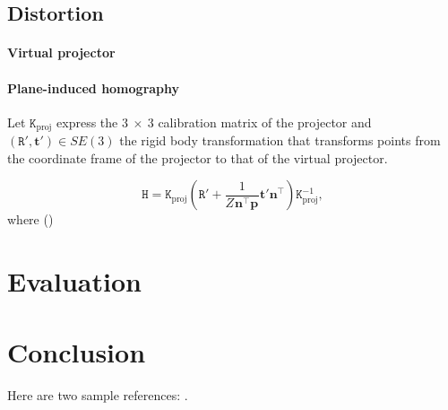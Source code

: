 \documentclass[review]{elsarticle}
\begin{document}
\subsection{Distortion}

\paragraph{Virtual projector}

\paragraph{Plane-induced homography} Let $\mathtt{K}_\text{proj}$ express the $3~\times~3$ calibration matrix of the projector and $(\mathtt{R}', \mathbf{t}') \in SE(3)$ the rigid body transformation that transforms points from the coordinate frame of the projector to that of the virtual projector.

\begin{equation}
\mathtt{H} = \mathtt{K}_\text{proj}\left(\mathtt{R}' + \frac{1}{Z^{} \mathbf{n}^\top \mathbf{p}^{}}\mathbf{t}'\mathbf{n}^\top\right)\mathtt{K}_\text{proj}^{-1},
\label{homgen}
\end{equation}
where ()

\section{Evaluation}

\section{Conclusion}

Here are two sample references: \cite{Feynman1963118,Dirac1953888}.


\end{document}
